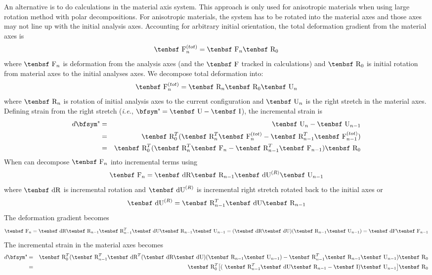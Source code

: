 \documentclass[11pt]{book}
\def\F{\hbox{\tenbsf F}}
\def\dF{\hbox{\tenbsf dF}}
\def\I{\hbox{\tenbsf I}}
\def\R{\hbox{\tenbsf R}}
\def\dR{\hbox{\tenbsf dR}}
\def\U{\hbox{\tenbsf U}}
\def\dU{\hbox{\tenbsf dU}}
\def\et{{\hbox{\bfsym\char'042}}}
\begin{document}
An alternative is to do calculations in the material axis system. This approach is only used for anisotropic materials when using large rotation method with polar decompositions. For anisotropic materials, the system has to be rotated into the material axes and those axes may not line up with the initial analysis axes. Accounting for arbitrary initial orientation, the total deformation gradient from the material axes is
\begin{equation}
   \F_n^{(tot)} = \F_n\R_0
\end{equation}
where $\F_n$ is deformation from the analysis axes (and the $\F$ tracked in calculations) and $\R_0$ is initial rotation from material axes to the initial analyses axes. We decompose total deformation into:
\begin{equation}
   \F_n^{(tot)} = \R_n\R_0\U_n
\end{equation}
where $\R_n$ is rotation of initial analysis axes to the current configuration and $\U_n$ is the right stretch in the material axes. Defining strain from the right stretch (\emph{i.e.}, $\et=\U-\I$), the incremental strain is
\begin{eqnarray}
     d\et & = & \U_n - \U_{n-1} \\
     & = & \R_0^T(\R_n^T\F_n^{(tot)} - \R_{n-1}^T\F_{n-1}^{(tot)} )\\
     & = & \R_0^T(\R_n^T\F_n - \R_{n-1}^T\F_{n-1})\R_0 
\end{eqnarray}
When can decompose $\F_n$ into incremental terms using
\begin{equation}
   \F_n = \dR\R_{n-1}\dU^{(R)}\U_{n-1}
\end{equation}
where $\dR$ is incremental rotation and $\dU^{(R)}$ is incremental right stretch rotated back to the initial axes or 
\begin{equation}
   \dU^{(R)} =  \R_{n-1}^T \dU \R_{n-1}
\end{equation}
The deformation gradient becomes
\begin{equation}
   \F_n = \dR\R_{n-1} \R_{n-1}^T \dU \R_{n-1}\U_{n-1} =( \dR\dU)( \R_{n-1}\U_{n-1}) =  \dF \F_{n-1}
\end{equation}
The incremental strain in the material axes becomes
\begin{eqnarray}
     d\et & = &  \R_0^T(\R_{n-1}^T\dR^T( \dR\dU)( \R_{n-1}\U_{n-1})  - \R_{n-1}^T\R_{n-1}\U_{n-1})\R_0 \\
     	& = &  \R_0^T\bigl[(\ \R_{n-1}^T \dU \R_{n-1} - \I)\U_{n-1}\bigr]\R_0 
\end{eqnarray}
\end{document}
